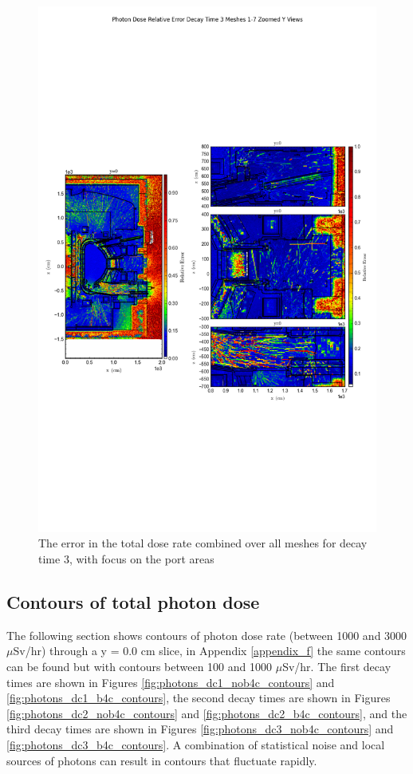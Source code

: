 \documentclass[12pt]{article}
\begin{document}
\begin{figure}[ht!]
\centering
\includegraphics[trim={0cm 9cm 0cm 10cm},clip,scale=0.75]{../plots/final_model_with_b4c/Photon_Dose_Relative_Error_Decay_Time_3_Meshes_1-7_Zoomed_Y_Views.png}
\caption{The error in the total dose rate combined over all meshes for decay time 3, with focus on the port areas}
\label{fig:photons_dc3_b4c_total_error_zoomed}
\end{figure}

\newpage
\clearpage

\subsection{Contours of total photon dose}
The following section shows contours of photon dose rate (between 1000 and 3000 $\mu$Sv/hr) through a y = 0.0 cm slice, in Appendix \ref{appendix_f} the same contours can be
found but with contours between 100 and 1000 $\mu$Sv/hr. The first decay times are shown in Figures \ref{fig:photons_dc1_nob4c_contours}
and \ref{fig:photons_dc1_b4c_contours}, the second decay times are shown in Figures \ref{fig:photons_dc2_nob4c_contours}
and \ref{fig:photons_dc2_b4c_contours}, and the third decay times are shown in Figures \ref{fig:photons_dc3_nob4c_contours}
and \ref{fig:photons_dc3_b4c_contours}.  A combination of statistical noise and local
sources of photons can result in contours that fluctuate rapidly.
\end{document}
